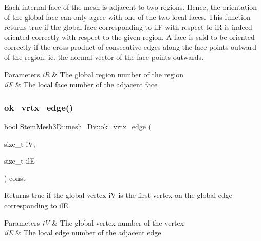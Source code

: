 Each internal face of the mesh is adjacent to two regions. Hence, the orientation of the global face can only agree with one of the two local faces. This function returns true if the global face corresponding to ilF with respect to iR is indeed oriented correctly with respect to the given region. A face is said to be oriented correctly if the cross product of consecutive edges along the face points outward of the region. ie. the normal vector of the face points outwards. 
\begin{DoxyParams}{Parameters}
{\em iR} & The global region number of the region \\
\hline
{\em ilF} & The local face number of the adjacent face \\
\hline
\end{DoxyParams}
\mbox{\label{classStemMesh3D_1_1mesh__3Dv_a1bcbb55c1a867e69c088f13ce09f924f}} 
\subsubsection{\texorpdfstring{ok\+\_\+vrtx\+\_\+edge()}{ok\_vrtx\_edge()}}
{\footnotesize\ttfamily bool Stem\+Mesh3\+D\+::mesh\+\_\+Dv\+::ok\+\_\+vrtx\+\_\+edge (\begin{DoxyParamCaption}\item[{size\+\_\+t}]{iV,  }\item[{size\+\_\+t}]{ilE }\end{DoxyParamCaption}) const}



Returns true if the global vertex iV is the first vertex on the global edge corresponding to ilE. 


\begin{DoxyParams}{Parameters}
{\em iV} & The global vertex number of the vertex \\
\hline
{\em ilE} & The local edge number of the adjacent edge \\
\hline
\end{DoxyParams}
\mbox{\label{classStemMesh3D_1_1mesh__3Dv_a761e6d7a78b1547681310935e1ce0a8c}} 
